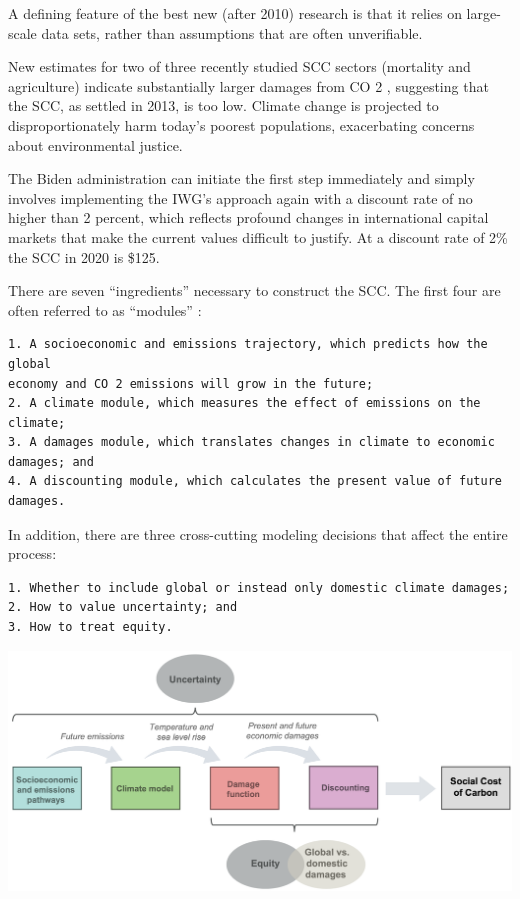 \documentclass[
]{book}
\begin{document}
A defining feature of the best new (after 2010) research is that it relies on large-scale data
sets, rather than assumptions that are often unverifiable.

New estimates for two of three recently studied SCC
sectors (mortality and agriculture) indicate substantially larger damages from CO 2 ,
suggesting that the SCC, as settled in 2013, is too low.
Climate change is projected to disproportionately
harm today's poorest populations, exacerbating concerns about environmental justice.

The Biden administration can initiate the first step immediately
and simply involves implementing the IWG's approach again with a discount rate of no
higher than 2 percent, which reflects profound changes in international capital markets
that make the current values difficult to justify. At a discount rate of 2\% the SCC in
2020 is \$125.

There are seven ``ingredients'' necessary to construct the SCC. The first four are often
referred to as ``modules'' :

\begin{verbatim}
1. A socioeconomic and emissions trajectory, which predicts how the global  
economy and CO 2 emissions will grow in the future;  
2. A climate module, which measures the effect of emissions on the climate;  
3. A damages module, which translates changes in climate to economic  
damages; and  
4. A discounting module, which calculates the present value of future  
damages.  
\end{verbatim}

In addition, there are three cross-cutting modeling decisions
that affect the entire process:

\begin{verbatim}
1. Whether to include global or instead only domestic climate damages;  
2. How to value uncertainty; and  
3. How to treat equity.  
\end{verbatim}

\includegraphics{fig/scc_steps.png}
\end{document}
